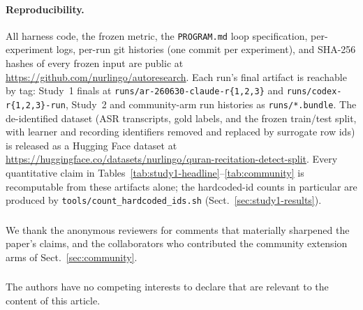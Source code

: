 \documentclass[runningheads]{llncs}
\begin{document}
\paragraph{Reproducibility.} All harness code, the frozen metric, the
\texttt{PROGRAM.md} loop specification, per-experiment logs, per-run git
histories (one commit per experiment), and SHA-256 hashes of every frozen
input are public at \url{https://github.com/nurlingo/autoresearch}. Each
run's final artifact is reachable by tag: Study~1 finals at
\texttt{runs/ar-260630-claude-r\{1,2,3\}} and \texttt{runs/codex-r\{1,2,3\}-run},
Study~2 and community-arm run histories as \texttt{runs/*.bundle}. The
de-identified dataset (ASR transcripts, gold labels, and the frozen
train/test split, with learner and recording identifiers removed and
replaced by surrogate row ids) is released as a Hugging Face dataset at
\url{https://huggingface.co/datasets/nurlingo/quran-recitation-detect-split}.
Every quantitative claim in Tables~\ref{tab:study1-headline}--\ref{tab:community}
is recomputable from these artifacts alone; the hardcoded-id counts in
particular are produced by \texttt{tools/count\_hardcoded\_ids.sh}
(Sect.~\ref{sec:study1-results}).

\begin{credits}
\subsubsection{\ackname}
We thank the anonymous reviewers for comments that materially sharpened the
paper's claims, and the collaborators who contributed the community
extension arms of Sect.~\ref{sec:community}.

\subsubsection{\discintname}
The authors have no competing interests to declare that are relevant to the
content of this article.
\end{credits}



\end{document}
